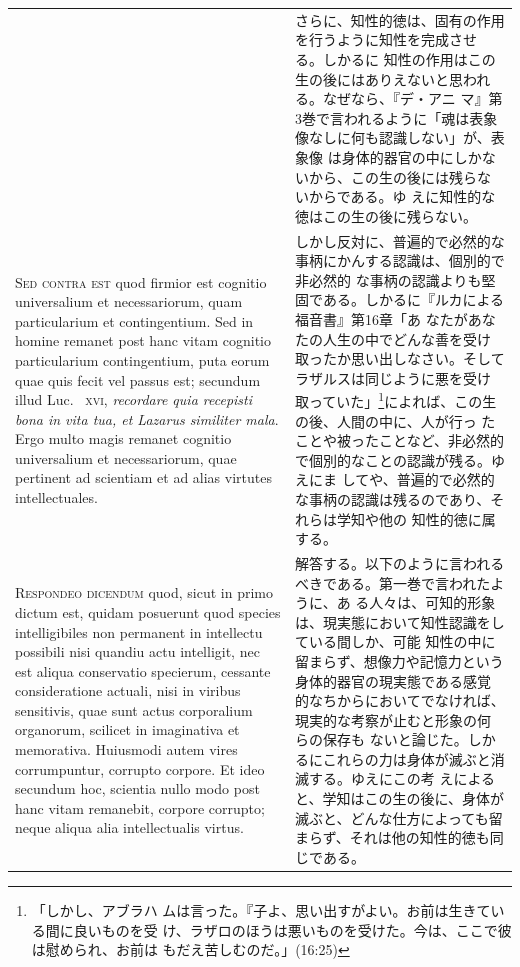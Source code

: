 \documentclass[paper=a4paper,fontsize=10pt,jafontsize=9pt,titlepage]{jlreq}
\begin{document}
\begin{longtable}{p{21em}p{21em}}
&

 さらに、知性的徳は、固有の作用を行うように知性を完成させる。しかるに
 知性の作用はこの生の後にはありえないと思われる。なぜなら、『デ・アニ
 マ』第3巻で言われるように「魂は表象像なしに何も認識しない」が、表象像
 は身体的器官の中にしかないから、この生の後には残らないからである。ゆ
 えに知性的な徳はこの生の後に残らない。

\\



 {\scshape Sed contra est} quod firmior est cognitio universalium et
 necessariorum, quam particularium et contingentium. Sed in homine
 remanet post hanc vitam cognitio particularium contingentium, puta
 eorum quae quis fecit vel passus est; secundum illud Luc.~{\scshape
 xvi}, {\itshape recordare quia recepisti bona in vita tua, et Lazarus
 similiter mala}. Ergo multo magis remanet cognitio universalium et
 necessariorum, quae pertinent ad scientiam et ad alias virtutes
 intellectuales.

 
&

 しかし反対に、普遍的で必然的な事柄にかんする認識は、個別的で非必然的
 な事柄の認識よりも堅固である。しかるに『ルカによる福音書』第16章「あ
 なたがあなたの人生の中でどんな善を受け取ったか思い出しなさい。そして
 ラザルスは同じように悪を受け取っていた」\footnote{「しかし、アブラハ
 ムは言った。『子よ、思い出すがよい。お前は生きている間に良いものを受
 け、ラザロのほうは悪いものを受けた。今は、ここで彼は慰められ、お前は
 もだえ苦しむのだ。」(16:25)}によれば、この生の後、人間の中に、人が行っ
 たことや被ったことなど、非必然的で個別的なことの認識が残る。ゆえにま
 してや、普遍的で必然的な事柄の認識は残るのであり、それらは学知や他の
 知性的徳に属する。

\\




 {\scshape Respondeo dicendum} quod, sicut in primo dictum est, quidam
 posuerunt quod species intelligibiles non permanent in intellectu
 possibili nisi quandiu actu intelligit, nec est aliqua conservatio
 specierum, cessante consideratione actuali, nisi in viribus
 sensitivis, quae sunt actus corporalium organorum, scilicet in
 imaginativa et memorativa. Huiusmodi autem vires corrumpuntur,
 corrupto corpore. Et ideo secundum hoc, scientia nullo modo post hanc
 vitam remanebit, corpore corrupto; neque aliqua alia intellectualis
 virtus.


&

 解答する。以下のように言われるべきである。第一巻で言われたように、あ
 る人々は、可知的形象は、現実態において知性認識をしている間しか、可能
 知性の中に留まらず、想像力や記憶力という身体的器官の現実態である感覚
 的なちからにおいてでなければ、現実的な考察が止むと形象の何らの保存も
 ないと論じた。しかるにこれらの力は身体が滅ぶと消滅する。ゆえにこの考
 えによると、学知はこの生の後に、身体が滅ぶと、どんな仕方によっても留
 まらず、それは他の知性的徳も同じである。


\end{longtable}
\end{document}
